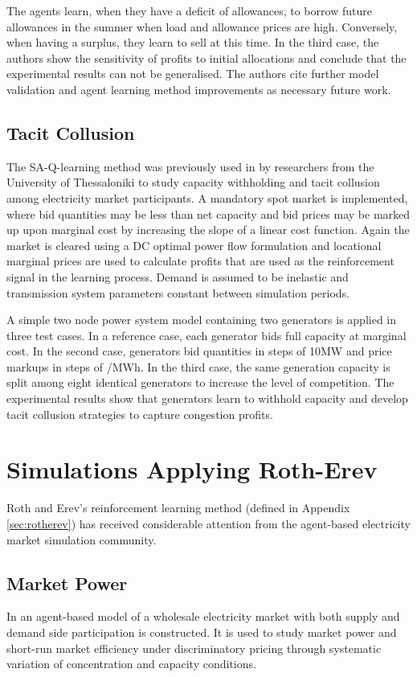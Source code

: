 The agents learn, when they have a deficit of allowances, to borrow future
allowances in the summer when load and allowance prices are high.  Conversely,
when having a surplus, they learn to sell at this time.  In the third case, the
authors show the sensitivity of profits to initial allocations and conclude
that the experimental results can not be generalised.  The authors cite
further model validation and agent learning method improvements as necessary
future work.

\subsection{Tacit Collusion}
The SA-Q-learning method was previously used in  by
researchers from the University of Thessaloniki to study capacity withholding
and tacit collusion among electricity market participants.  A mandatory spot
market is implemented, where bid quantities may be less than net capacity and
bid prices may be marked up upon marginal cost by increasing the slope of a
linear cost function.  Again the market is cleared using a DC
optimal power flow formulation and locational marginal prices are used to
calculate profits that are used as the reinforcement signal in the learning
process.  Demand is assumed to be inelastic and transmission system parameters
constant between simulation periods.

A simple two node power system model containing two generators is applied in
three test cases. In a reference case, each generator bids full capacity at
marginal cost.  In the second case, generators bid quantities in steps of 10MW
and price markups in steps of /MWh.  In the third case, the same
generation capacity is split among eight identical generators to increase the
level of competition. The experimental results show that generators learn to
withhold capacity and develop tacit collusion strategies to capture
congestion profits.

\section{Simulations Applying Roth-Erev}
Roth and Erev's reinforcement learning method (defined in Appendix
\ref{sec:rotherev}) has received considerable attention from the
agent-based electricity market simulation community.

\subsection{Market Power}
In  an agent-based model of a wholesale electricity market
with both supply and demand side participation is constructed.  It is used to
study market power and short-run market efficiency under discriminatory pricing
through systematic variation of concentration and capacity conditions.

